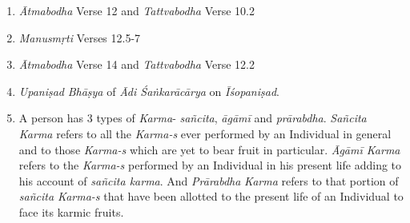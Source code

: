 \begin{enumerate}
\item
  \emph{Ātmabodha} Verse 12 and \emph{Tattvabodha} Verse 10.2
\item
  \emph{Manusmṛti} Verses 12.5-7
\item
  \emph{Ātmabodha} Verse 14 and \emph{Tattvabodha} Verse 12.2
\item
  \emph{Upaniṣad} \emph{Bhāṣya} of \emph{Ādi Śaṅkarācārya} on \emph{Īśopaniṣad}.
\item
  A person has 3 types of \emph{Karma}- \emph{sañcita}, \emph{āgāmī} and \emph{prārabdha}. \emph{Sañcita} \emph{Karma} refers to all the \emph{Karma-s} ever performed by an Individual in general and to those \emph{Karma-s} which are yet to bear fruit in particular. \emph{Āgāmī Karma} refers to the \emph{Karma-s} performed by an Individual in his present life adding to his account of \emph{sañcita karma}. And \emph{Prārabdha} \emph{Karma} refers to that portion of \emph{sañcita Karma-s} that have been allotted to the present life of an Individual to face its karmic fruits.
\end{enumerate}


